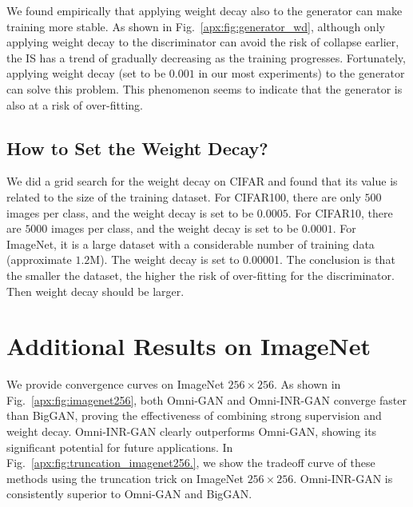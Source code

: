 \documentclass[paper_2425.tex]{subfiles}
\begin{document}
We found empirically that applying weight decay also to the generator can make training more stable. As shown in Fig.~\ref{apx:fig:generator_wd}, although only applying weight decay to the discriminator can avoid the risk of collapse earlier, the IS has a trend of gradually decreasing as the training progresses. Fortunately, applying weight decay (set to be $0.001$ in our most experiments) to the generator can solve this problem. This phenomenon seems to indicate that the generator is also at a risk of over-fitting.



\subsection{How to Set the Weight Decay?}

We did a grid search for the weight decay on CIFAR and found that its value is related to the size of the training dataset. For CIFAR100, there are only $500$ images per class, and the weight decay is set to be $0.0005$. For CIFAR10, there are $5000$ images per class, and the weight decay is set to be $0.0001$. For ImageNet, it is a large dataset with a considerable number of training data (approximate $1.2$M). The weight decay is set to 0.00001. The conclusion is that the smaller the dataset, the higher the risk of over-fitting for the discriminator. Then weight decay should be larger.


\section{Additional Results on ImageNet}
\label{apx:sec:curves_imagenet}

We provide convergence curves on ImageNet $256\times256$. As shown in Fig.~\ref{apx:fig:imagenet256}, both Omni-GAN and Omni-INR-GAN converge faster than BigGAN, proving the effectiveness of combining strong supervision and weight decay. Omni-INR-GAN clearly outperforms Omni-GAN, showing its significant potential for future applications. In Fig.~\ref{apx:fig:truncation_imagenet256.}, we show the tradeoff curve of these methods using the truncation trick on ImageNet $256\times256$. Omni-INR-GAN is consistently superior to Omni-GAN and BigGAN.
\end{document}
